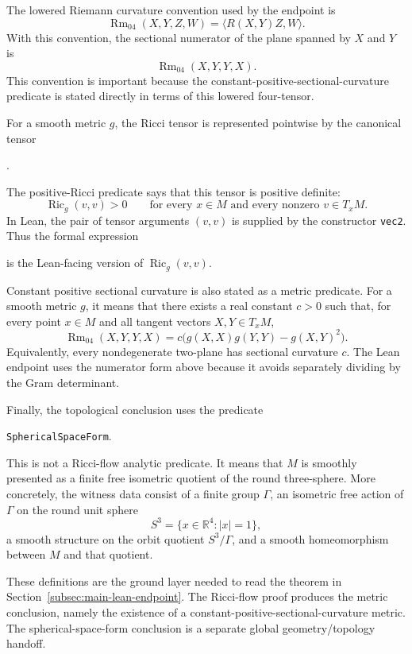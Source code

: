 \documentclass[11pt]{article}
\theoremstyle{plain}
\theoremstyle{definition}
\theoremstyle{remark}
\begin{document}
The lowered Riemann curvature convention used by the endpoint is
\[
  \operatorname{Rm}_{04}(X,Y,Z,W)=\langle R(X,Y)Z,W\rangle .
\]
With this convention, the sectional numerator of the plane spanned by \(X\) and
\(Y\) is
\[
  \operatorname{Rm}_{04}(X,Y,Y,X).
\]
This convention is important because the constant-positive-sectional-curvature
predicate is stated directly in terms of this lowered four-tensor.

For a smooth metric \(g\), the Ricci tensor is represented pointwise by the
canonical tensor
\begin{center}
\texttt{}.
\end{center}
The positive-Ricci predicate says that this tensor is positive definite:
\[
  \operatorname{Ric}_g(v,v)>0
  \qquad
  \text{for every }x\in M\text{ and every nonzero }v\in T_xM .
\]
In Lean, the pair of tensor arguments \((v,v)\) is supplied by the constructor
\texttt{vec2}.  Thus the formal expression
\begin{center}
\texttt{}
\end{center}
is the Lean-facing version of \(\operatorname{Ric}_g(v,v)\).

Constant positive sectional curvature is also stated as a metric predicate.
For a smooth metric \(g\), it means that there exists a real constant \(c>0\)
such that, for every point \(x\in M\) and all tangent vectors
\(X,Y\in T_xM\),
\[
  \operatorname{Rm}_{04}(X,Y,Y,X)
  =
  c\bigl(
    g(X,X)g(Y,Y)-g(X,Y)^2
  \bigr).
\]
Equivalently, every nondegenerate two-plane has sectional curvature \(c\).
The Lean endpoint uses the numerator form above because it avoids separately
dividing by the Gram determinant.

Finally, the topological conclusion uses the predicate
\begin{center}
\texttt{SphericalSpaceForm}.
\end{center}
This is not a Ricci-flow analytic predicate.  It means that \(M\) is smoothly
presented as a finite free isometric quotient of the round three-sphere.  More
concretely, the witness data consist of a finite group \(\Gamma\), an isometric
free action of \(\Gamma\) on the round unit sphere
\[
  S^3=\{x\in \mathbb{R}^4:|x|=1\},
\]
a smooth structure on the orbit quotient \(S^3/\Gamma\), and a smooth
homeomorphism between \(M\) and that quotient.

These definitions are the ground layer needed to read the theorem in
Section~\ref{subsec:main-lean-endpoint}.  The Ricci-flow proof produces the metric
conclusion, namely the existence of a constant-positive-sectional-curvature
metric.  The spherical-space-form conclusion is a separate global
geometry/topology handoff.
\end{document}
